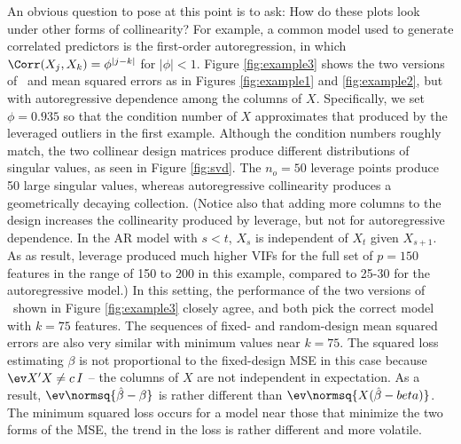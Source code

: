 \documentclass[12pt]{article}
\begin{document}
 An obvious question to pose at this point is to ask: How do these plots look
 under other forms of collinearity?  For example, a common model used to
 generate correlated predictors is the first-order autoregression, in which
 $\Corr(X_j,X_k) = \phi^{|j-k|}$ for $|\phi| < 1$.  Figure \ref{fig:example3}
 shows the two versions of \aic\ and mean squared errors as in Figures
 \ref{fig:example1} and \ref{fig:example2}, but with autoregressive dependence
 among the columns of $X$.  Specifically, we set $\phi=0.935$ so that the
 condition number of $X$ approximates that produced by the leveraged outliers in
 the first example.  Although the condition numbers roughly match, the two
 collinear design matrices produce different distributions of singular values,
 as seen in Figure \ref{fig:svd}.  The $n_o=50$ leverage points produce 50 large
 singular values, whereas autoregressive collinearity produces a geometrically
 decaying collection.  (Notice also that adding more columns to the design
 increases the collinearity produced by leverage, but not for autoregressive
 dependence.  In the AR model with $s < t$, $X_s$ is independent of $X_t$ given
 $X_{s+1}$.  As as result, leverage produced much higher VIFs for the full set
 of $p=150$ features in the range of 150 to 200 in this example, compared to
 25-30 for the autoregressive model.)  In this setting, the performance of the
 two versions of \aic\ shown in Figure \ref{fig:example3} closely agree, and
 both pick the correct model with $k = 75$ features.  The sequences of fixed-
 and random-design mean squared errors are also very similar with minimum values
 near $k=75$.  The squared loss estimating $\beta$ is not proportional to the
 fixed-design MSE in this case because $\ev X'X \ne c\,I$ -- the columns of $X$
 are not independent in expectation.  As a result, $\ev \normsq{\hat\beta -
 \beta}$ is rather different than $\ev \normsq{ X (\hat\beta - beta)}$.  The
 minimum squared loss occurs for a model near those that minimize the two forms
 of the MSE, the trend in the loss is rather different and more volatile.
\end{document}

